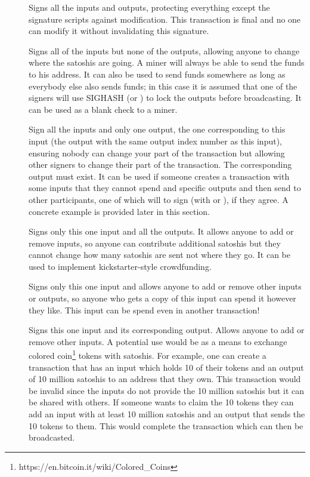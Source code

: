 \begin{description}
\item[] Signs all the inputs and outputs, protecting everything except the signature scripts against modification. This transaction is final and no one can modify it without invalidating this signature.
\item[] Signs all of the inputs but none of the outputs, allowing anyone to change where the satoshis are going. A miner will always be able to send the funds to his address.
	It can also be used to send funds somewhere as long as everybody else also sends funds; in this case it is assumed that one of the signers will use SIGHASH  (or ) to lock the outputs before broadcasting. It can be used as a blank check to a miner. 
\item[] Sign all the inputs and only one output, the one corresponding to this input (the output with the same output index number as this input), ensuring nobody can change your part of the transaction but allowing other signers to change their part of the transaction. The corresponding output must exist. It can be used if someone creates a transaction with some inputs that they cannot spend and specific outputs and then send to other participants, one of which will to sign (with  or ), if they agree. A concrete example is provided later in this section.
\item[] Signs only this one input and all the outputs. It allows anyone to add or remove inputs, so anyone can contribute additional satoshis but they cannot change how many satoshis are sent not where they go. It can be used to implement kickstarter-style crowdfunding.
\item[] Signs only this one input and allows anyone to add or remove other inputs or outputs, so anyone who gets a copy of this input can spend it however they like. This input can be spend even in another transaction!
\item[] Signs this one input and its corresponding output. Allows anyone to add or remove other inputs. A potential use would be as a means to exchange colored coin\footnote{https://en.bitcoin.it/wiki/Colored\_Coins} tokens with satoshis. For example, one can create a transaction that has an input which holds 10 of their tokens and an output of 10 million satoshis to an address that they own. This transaction would be invalid since the inputs do not provide the 10 million satoshis but it can be shared with others. If someone wants to claim the 10 tokens they can add an input with at least 10 million satoshis and an output that sends the 10 tokens to them. This would complete the transaction which can then be broadcasted.
\end{description}

